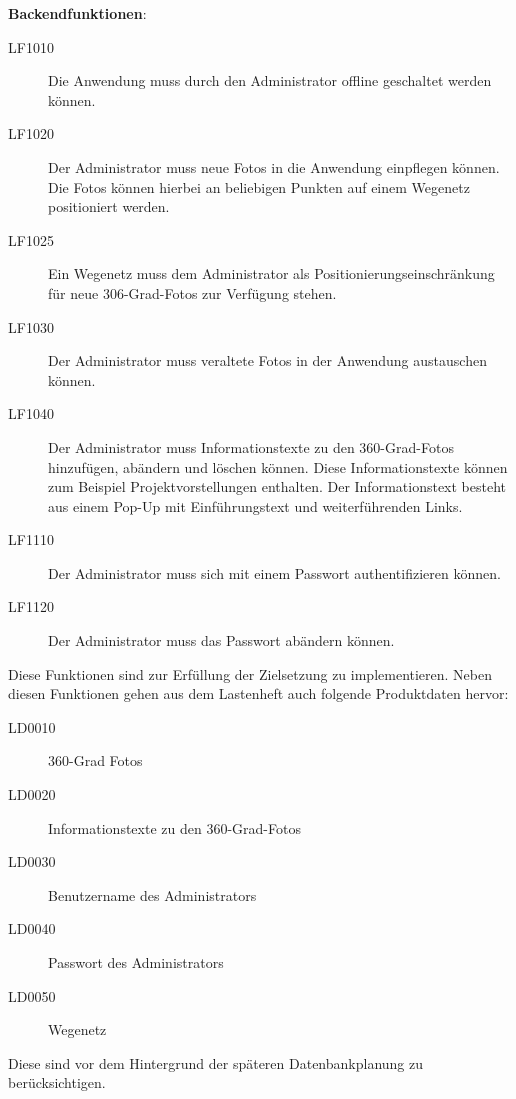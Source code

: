 \textbf{Backendfunktionen}:

\begin{description}
  \item[LF1010] Die Anwendung muss durch den Administrator offline geschaltet werden können.
  \item[LF1020] Der Administrator muss neue Fotos in die Anwendung einpflegen können. Die Fotos können hierbei an beliebigen Punkten auf einem Wegenetz positioniert werden.
  \item[LF1025] Ein Wegenetz muss dem Administrator als Positionierungseinschränkung für neue 306-Grad-Fotos zur Verfügung stehen.
  \item[LF1030] Der Administrator muss veraltete Fotos in der Anwendung austauschen können.
  \item[LF1040] Der Administrator muss Informationstexte zu den 360-Grad-Fotos hinzufügen, abändern und löschen können. Diese Informationstexte können zum Beispiel Projektvorstellungen enthalten. Der Informationstext besteht aus einem Pop-Up mit Einführungstext und weiterführenden Links.
  \item[LF1110] Der Administrator muss sich mit einem Passwort authentifizieren können.
  \item[LF1120] Der Administrator muss das Passwort abändern können.
\end{description}

Diese Funktionen sind zur Erfüllung der Zielsetzung zu implementieren. Neben diesen Funktionen gehen aus dem Lastenheft 
auch folgende Produktdaten hervor:

\begin{description}
  \item[LD0010] 360-Grad Fotos
  \item[LD0020] Informationstexte zu den 360-Grad-Fotos
  \item[LD0030] Benutzername des Administrators
  \item[LD0040] Passwort des Administrators
  \item[LD0050] Wegenetz
\end{description}

Diese sind vor dem Hintergrund der späteren Datenbankplanung zu berücksichtigen.